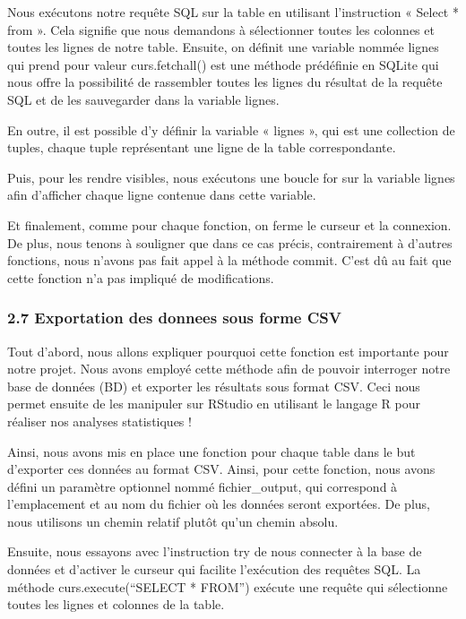 \documentclass[
]{article}
\begin{document}
Nous exécutons notre requête SQL sur la table en utilisant l'instruction
« Select * from ». Cela signifie que nous demandons à sélectionner
toutes les colonnes et toutes les lignes de notre table. Ensuite, on
définit une variable nommée lignes qui prend pour valeur curs.fetchall()
est une méthode prédéfinie en SQLite qui nous offre la possibilité de
rassembler toutes les lignes du résultat de la requête SQL et de les
sauvegarder dans la variable lignes.

En outre, il est possible d'y définir la variable « lignes », qui est
une collection de tuples, chaque tuple représentant une ligne de la
table correspondante.

Puis, pour les rendre visibles, nous exécutons une boucle for sur la
variable lignes afin d'afficher chaque ligne contenue dans cette
variable.

Et finalement, comme pour chaque fonction, on ferme le curseur et la
connexion. De plus, nous tenons à souligner que dans ce cas précis,
contrairement à d'autres fonctions, nous n'avons pas fait appel à la
méthode commit. C'est dû au fait que cette fonction n'a pas impliqué de
modifications.

\subsubsection{2.7 Exportation des donnees sous forme
CSV}\label{exportation-des-donnees-sous-forme-csv}

Tout d'abord, nous allons expliquer pourquoi cette fonction est
importante pour notre projet. Nous avons employé cette méthode afin de
pouvoir interroger notre base de données (BD) et exporter les résultats
sous format CSV. Ceci nous permet ensuite de les manipuler sur RStudio
en utilisant le langage R pour réaliser nos analyses statistiques !

Ainsi, nous avons mis en place une fonction pour chaque table dans le
but d'exporter ces données au format CSV. Ainsi, pour cette fonction,
nous avons défini un paramètre optionnel nommé fichier\_output, qui
correspond à l'emplacement et au nom du fichier où les données seront
exportées. De plus, nous utilisons un chemin relatif plutôt qu'un chemin
absolu.

Ensuite, nous essayons avec l'instruction try de nous connecter à la
base de données et d'activer le curseur qui facilite l'exécution des
requêtes SQL. La méthode curs.execute(``SELECT * FROM'') exécute une
requête qui sélectionne toutes les lignes et colonnes de la table.
\end{document}
